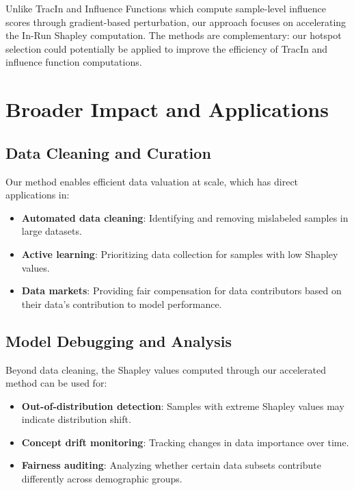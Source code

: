 \documentclass[12pt,a4paper]{report}
\begin{document}
Unlike TracIn \citep{park2023trak} and Influence Functions \citep{koh2017understanding} which compute sample-level influence scores through gradient-based perturbation, our approach focuses on accelerating the In-Run Shapley computation. The methods are complementary: our hotspot selection could potentially be applied to improve the efficiency of TracIn and influence function computations.

\section{Broader Impact and Applications}
\label{sec:impact}

\subsection{Data Cleaning and Curation}
\label{sec:data_cleaning}

Our method enables efficient data valuation at scale, which has direct applications in:

\begin{itemize}
    \item \textbf{Automated data cleaning}: Identifying and removing mislabeled samples in large datasets.
    \item \textbf{Active learning}: Prioritizing data collection for samples with low Shapley values.
    \item \textbf{Data markets}: Providing fair compensation for data contributors based on their data's contribution to model performance.
\end{itemize}

\subsection{Model Debugging and Analysis}
\label{sec:debugging}

Beyond data cleaning, the Shapley values computed through our accelerated method can be used for:

\begin{itemize}
    \item \textbf{Out-of-distribution detection}: Samples with extreme Shapley values may indicate distribution shift.
    \item \textbf{Concept drift monitoring}: Tracking changes in data importance over time.
    \item \textbf{Fairness auditing}: Analyzing whether certain data subsets contribute differently across demographic groups.
\end{itemize}
\end{document}

